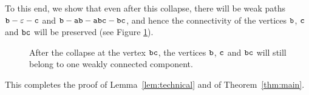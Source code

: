 To this end, we show that even after this collapse, there will be weak paths $ {\tt b} - \varepsilon - {\tt c} $ and $ {\tt b} - {\tt ab} - {\tt abc} - {\tt bc} $, and hence the connectivity of the vertices $ {\tt b} $, $ {\tt c} $ and $ {\tt bc} $ will be preserved (see Figure \ref{fig:lvl1final}).
\begin{figure}[ht]
\begin{center}

\end{center}

\caption{After the collapse at the vertex $ {\tt bc} $, the vertices $ {\tt b} $, $ {\tt c} $ and $ {\tt bc} $ will still belong to one weakly connected component.}\label{fig:lvl1final}
\end{figure}

This completes the proof of Lemma~\ref{lem:technical} and of Theorem~\ref{thm:main}.